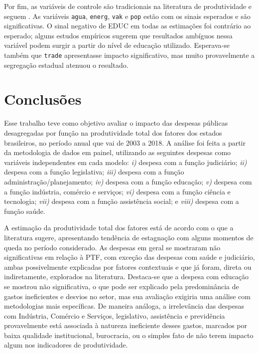 \documentclass[
  12pt,
  a4paper,
  oneside,
  brazil,
  chapter=TITLE,
  section=TITLE
]{abntex2}
\begin{document}
Por fim, as variáveis de controle são tradicionais na literatura de produtividade e seguem . As variáveis \texttt{agua}, \texttt{energ}, \texttt{vak} e \texttt{pop} estão com os sinais esperados e são significativas. O sinal negativo de EDUC em todas as estimações foi contrário ao esperado; alguns estudos empíricos \cite{liu2019,dahal2013} sugerem que resultados ambíguos nessa variável podem surgir a partir do nível de educação utilizado. Esperava-se também que \texttt{trade} apresentasse impacto significativo, mas muito provavelmente a segregação estadual atenuou o resultado.

\chapter{Conclusões}

Esse trabalho teve como objetivo avaliar o impacto das despesas públicas desagregadas por função na produtividade total dos fatores dos estados brasileiros, no período anual que vai de 2003 a 2018. A análise foi feita a partir da metodologia de dados em painel, utilizando as seguintes despesas como variáveis independentes em cada modelo: \textit{i)} despesa com a função judiciário; \textit{ii)} despesa com a função legislativa; \textit{iii)} despesa com a função administração/planejamento; \textit{iv)} despesa com a função educação; \textit{v)} despesa com a função indústria, comércio e serviços; \textit{vi)} despesa com a função ciência e tecnologia; \textit{vii)} despesa com a função assistência social; e \textit{viii)} despesa com a função saúde.

A estimação da produtividade total dos fatores está de acordo com o que a literatura sugere, apresentando tendência de estagnação com alguns momentos de queda no período considerado. As despesas em geral se mostraram não significativas em relação à PTF, com exceção das despesas com saúde e judiciário, ambas possivelmente explicadas por fatores contextuais e que já foram, direta ou indiretamente, explorados na literatura. Destaca-se que a despesa com educação se mostrou não significativa, o que pode ser explicado pela predominância de gastos ineficientes e desvios no setor, mas sua avaliação exigiria uma análise com metodologias mais específicas. De maneira análoga, a irrelevância das despesas com Indústria, Comércio e Serviços, legislativo, assistência e previdência provavelmente está associada à natureza ineficiente desses gastos, marcados por baixa qualidade institucional, burocracia, ou o simples fato de não terem impacto algum nos indicadores de produtividade.
\end{document}
